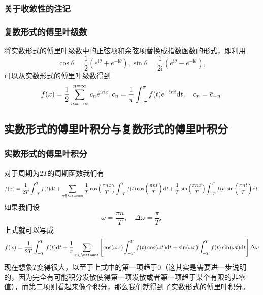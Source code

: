 \hypertarget{ux5173ux4e8eux6536ux655bux6027ux7684ux6ce8ux8bb0}{%
\subsubsection{关于收敛性的注记}\label{ux5173ux4e8eux6536ux655bux6027ux7684ux6ce8ux8bb0}}

\hypertarget{ux590dux6570ux5f62ux5f0fux7684sec:fourier-series}{%
\subsubsection{复数形式的傅里叶级数}\label{ux590dux6570ux5f62ux5f0fux7684sec:fourier-series}}

将实数形式的傅里叶级数中的正弦项和余弦项替换成指数函数的形式，即利用
\[
\cos \theta = \frac{1}{2} (e^{\mathrm{i} \theta} + e^{ - \mathrm{i} \theta}),
\sin \theta = \frac{1}{2 \mathrm{i}} (e^{\mathrm{i} \theta} - e^{ - \mathrm{i} \theta}),
\]
可以从实数形式的傅里叶级数得到
\[
f(x) = \frac{1}{2} \sum_{n = -\infty}^{n = \infty} c_n e^{\mathrm{i}n x}, \\
c_n = \frac{1}{\pi}\int_{-\pi}^{\pi} f(t) e^{-\mathrm{i}nt} \mathrm{d}t, \quad c_n = \overline{c}_{-n}.
\]

\hypertarget{ux5b9eux6570ux5f62ux5f0fux7684ux5085ux91ccux53f6ux79efux5206ux4e0eux590dux6570ux5f62ux5f0fux7684ux5085ux91ccux53f6ux79efux5206}{%
\subsection{实数形式的傅里叶积分与复数形式的傅里叶积分}\label{ux5b9eux6570ux5f62ux5f0fux7684ux5085ux91ccux53f6ux79efux5206ux4e0eux590dux6570ux5f62ux5f0fux7684ux5085ux91ccux53f6ux79efux5206}}

\hypertarget{ux5b9eux6570ux5f62ux5f0fux7684ux5085ux91ccux53f6ux79efux5206}{%
\subsubsection{实数形式的傅里叶积分}\label{ux5b9eux6570ux5f62ux5f0fux7684ux5085ux91ccux53f6ux79efux5206}}

对于周期为$2T$的周期函数我们有
\[
f(x) = \frac{1}{2T} \int_{-T}^{T} f(t) \mathrm{d}t + 
\sum_{n \in \natnums} \frac{1}{T} \cos \left( \frac{\pi n x}{T} \right) \int_{-T}^{T} f(t) \cos \left( \frac{\pi n t}{T} \right) \mathrm{d}t +
\frac{1}{T} \sin \left( \frac{\pi n x}{T} \right) \int_{-T}^{T} f(t) \sin \left( \frac{\pi n t}{T} \right) \mathrm{d}t.
\]
如果我们设
\[
\omega = \frac{\pi n}{T}, \quad \Delta \omega = \frac{\pi}{T},
\]
上式就可以写成
\[
f(x) = \frac{1}{2T} \int_{-T}^{T} f(t) \mathrm{d}t +
\frac{1}{\pi} \sum_{n \in \natnums} \left[ \cos(\omega x) \int_{-T}^{T} f(t) \cos(\omega t) \mathrm{d}t + \sin(\omega x) \int_{-T}^{T} f(t) \sin(\omega t) \mathrm{d}t \right] \Delta \omega
\]
现在想象$T$变得很大，以至于上式中的第一项趋于0（这其实是需要进一步说明的，因为完全有可能积分发散使得第一项发散或者第一项趋于某个有限的非零值），而第二项则看起来像个积分，那么我们就得到了实数形式的傅里叶积分。

